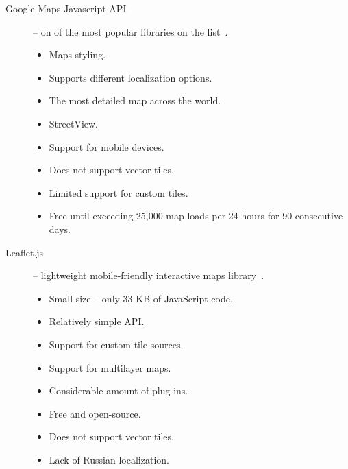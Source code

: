 \begin{description}

  \item[Google Maps Javascript API] -- on of the most popular libraries
    on the list~\cite{google:maps}. \\
    \underline{}
    \begin{itemize}
      \item Maps styling.
      \item Supports different localization options.
      \item The most detailed map across the world.
      \item StreetView.
      \item Support for mobile devices.
    \end{itemize}

    \underline{}
    \begin{itemize}
      \item Does not support vector tiles.
      \item Limited support for custom tiles.
      \item Free until exceeding 25,000 map loads per 24 hours for 90 consecutive days.
    \end{itemize}

  \item[Leaflet.js] -- lightweight mobile-friendly interactive maps
    library~\cite{leaflet}. \\
    \underline{}
    \begin{itemize}
      \item Small size -- only 33 KB of JavaScript code.
      \item Relatively simple API.
      \item Support for custom tile sources.
      \item Support for multilayer maps.
      \item Considerable amount of plug-ins.
      \item Free and open-source.
    \end{itemize}

    \underline{}
    \begin{itemize}
      \item Does not support vector tiles.
      \item Lack of Russian localization.
    \end{itemize}


\end{description}
